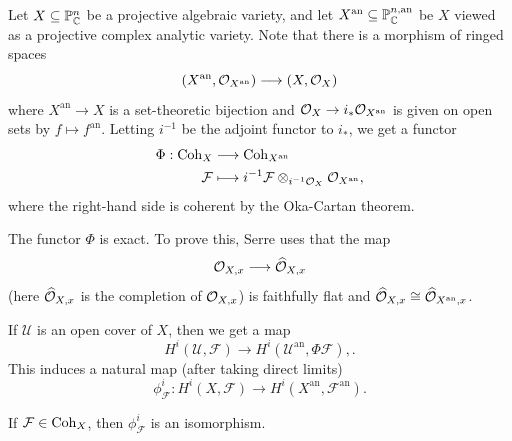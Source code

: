 \begin{remark}
  Let $X \subseteq \mathbb{P}^n_{\mathbb{C}}$ be a projective
  algebraic variety, and let
  $X^{\mathrm{an}} \subseteq \mathbb{P}^{n, \mathrm{an}}_{\mathbb{C}}$ be
  $X$ viewed as a projective
  complex analytic variety.
  Note that there is a morphism of ringed
  spaces
  \[
    (X^{\mathrm{an}}, \mathcal{O}_{X^{\mathrm{an}}})
    \longrightarrow (X, \mathcal{O}_X)
  \]
  where $X^{\mathrm{an}} \to X$ is a set-theoretic
  bijection and
  $\mathcal{O}_X \to i_* \mathcal{O}_{X^{\mathrm{an}}}$ is
  given on open sets
  by $f \mapsto f^{\mathrm{an}}$.
  Letting $i^{-1}$ be the adjoint functor
  to $i_*$, we get a functor
  \begin{align*}
    \Phi : \operatorname{Coh}_X &\longrightarrow \operatorname{Coh}_{X^{\mathrm{an}}} \\
    \mathcal{F} &\longmapsto i^{-1} \mathcal{F} \otimes_{i^{-1} \mathcal{O}_X} \mathcal{O}_{X^{\mathrm{an}}},
  \end{align*}
  where the right-hand side is coherent
  by the Oka-Cartan theorem.
\end{remark}

\begin{remark}
  The functor $\Phi$ is exact. To prove
  this, Serre uses that the map
  \[
    \mathcal{O}_{X, x}
    \longrightarrow \widehat{\mathcal{O}}_{X, x}
  \]
  (here $\widehat{\mathcal{O}}_{X, x}$ is the completion of $\mathcal{O}_{X, x}$)
  is faithfully flat and
  $\widehat{\mathcal{O}}_{X, x} \cong \widehat{\mathcal{O}}_{X^{\mathrm{an}}, x}$.
\end{remark}

\begin{remark}
  If $\mathcal{U}$ is an open cover of $X$,
  then we get a map
  \[
    H^i(\mathcal{U}, \mathcal{F})
    \longrightarrow H^i(\mathcal{U}^{\mathrm{an}}, \Phi \mathcal{F}),.
  \]
  This induces a natural map (after taking
  direct limits)
  \[
    \phi^i_{\mathcal{F}} : H^i(X, \mathcal{F})
    \longrightarrow H^i(X^{\mathrm{an}}, \mathcal{F}^{\mathrm{an}}).
  \]
\end{remark}

\begin{theorem}[Theorem A]\label{thm:theorem-a}
  If $\mathcal{F} \in \operatorname{Coh}_X$, then
  $\phi^i_\mathcal{F}$ is an isomorphism.
\end{theorem}

